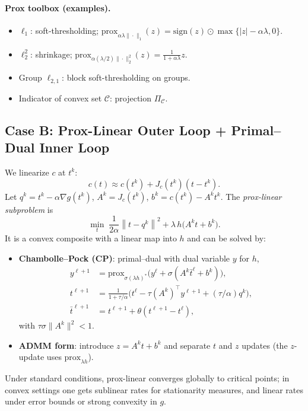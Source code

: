 \documentclass[11pt]{article}
\theoremstyle{plain}
\theoremstyle{definition}
\newcommand{\prox}{\mathrm{prox}}
\newcommand{\norm}[1]{\left\lVert #1 \right\rVert}
\newcommand{\1}{\mathbf{1}}
\begin{document}
\paragraph{Prox toolbox (examples).}
\begin{itemize}[leftmargin=2em]
 \item $\ell_1$: soft-thresholding; $\prox_{\alpha\lambda \|\cdot\|_1}(z)=\mathrm{sign}(z)\odot\max\{|z|-\alpha\lambda,0\}$.
 \item $\ell_2^2$: shrinkage; $\prox_{\alpha(\lambda/2)\|\cdot\|_2^2}(z)=\frac{1}{1+\alpha\lambda}z$.
 \item Group $\ell_{2,1}$: block soft-thresholding on groups.
 \item Indicator of convex set $\mathcal{C}$: projection $\Pi_{\mathcal{C}}$.
\end{itemize}

\subsection{Case B: Prox-Linear Outer Loop + Primal--Dual Inner Loop}
We linearize $c$ at $t^k$:
\[
 c(t)\approx c(t^k)+J_c(t^k)(t-t^k).
\]
Let $q^k=t^k-\alpha\nabla g(t^k)$, $A^k=J_c(t^k)$, $b^k=c(t^k)-A^k t^k$.
The \emph{prox-linear subproblem} is
\begin{equation}\label{eq:proxlin}
 \min_{t}\; \frac{1}{2\alpha}\norm{t-q^k}^2 + \lambda\,h\!\big(A^k t + b^k\big).
\end{equation}
It is a convex composite with a linear map into $h$ and can be solved by:
\begin{itemize}[leftmargin=2em]
 \item \textbf{Chambolle--Pock (CP)}: primal--dual with dual variable $y$ for $h$,
 \begin{align*}
 y^{\ell+1}&=\prox_{\sigma (\lambda h)^*}\big( y^\ell + \sigma(A^k \bar t^\ell + b^k)\big),\\
 t^{\ell+1}&=\frac{1}{1+\tau/\alpha}\Big( t^\ell - \tau (A^k)^\top y^{\ell+1} + (\tau/\alpha) q^k \Big),\\
 \bar t^{\ell+1}&=t^{\ell+1}+\theta(t^{\ell+1}-t^\ell),
 \end{align*}
 with $\tau\sigma\|A^k\|^2<1$.
 \item \textbf{ADMM form}: introduce $z=A^k t+b^k$ and separate $t$ and $z$ updates (the $z$-update uses $\prox_{\lambda h}$).
\end{itemize}
Under standard conditions, prox-linear converges globally to critical points; in convex settings one gets sublinear rates for stationarity measures, and linear rates under error bounds or strong convexity in $g$.
\end{document}
